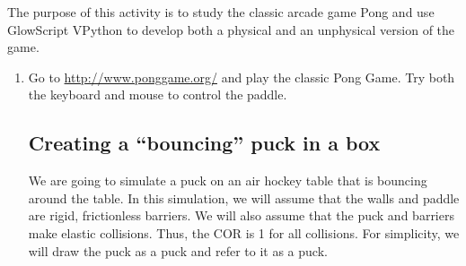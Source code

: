 
\apparatus
{}

\longgoal

The purpose of this activity is to study the classic arcade game Pong and use GlowScript VPython to develop both a physical and an unphysical version of the game.

\procedure

\begin{enumerate}

\subsection*{Playing Pong}

\item Go to \url{http://www.ponggame.org/} and play the classic Pong Game. Try both the keyboard and mouse to control the paddle.


\subsection*{Creating a ``bouncing'' puck in a box}

We are going to simulate a puck on an air hockey table that is bouncing around the table. In this simulation, we will assume that the walls and paddle are rigid, frictionless barriers. We will also assume that the puck and barriers make elastic collisions. Thus, the COR is 1 for all collisions. For simplicity, we will draw the puck as a puck and refer to it as a puck.


\end{enumerate}
